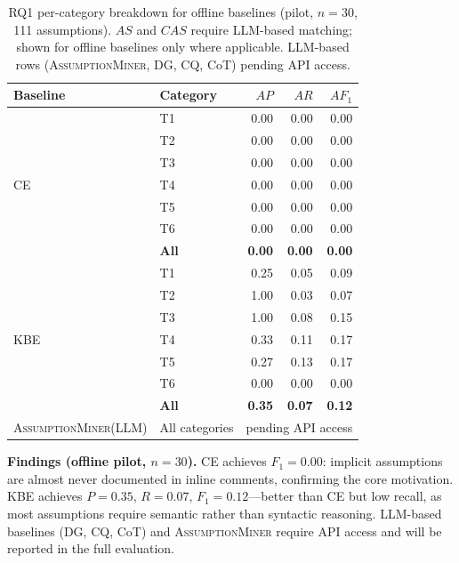 \documentclass[sigconf,review,anonymous]{acmart}
\newcommand{\sysname}{\textsc{AssumptionMiner}\xspace}
\newcommand{\AR}{$\mathit{AR}$\xspace}
\newcommand{\AP}{$\mathit{AP}$\xspace}
\newcommand{\AFone}{$\mathit{AF_1}$\xspace}
\newcommand{\AS}{$\mathit{AS}$\xspace}
\newcommand{\CAS}{$\mathit{CAS}$\xspace}
\begin{document}
\begin{table}[t]
\caption{RQ1 per-category breakdown for offline baselines (pilot, $n=30$, 111 assumptions).
         \AS and \CAS require LLM-based matching; shown for offline baselines only where applicable.
         LLM-based rows (\sysname, DG, CQ, CoT) pending API access.}
\label{tab:rq1breakdown}
\small
\begin{tabular}{@{}llrrr@{}}
\toprule
\textbf{Baseline} & \textbf{Category} & \AP & \AR & \AFone \\
\midrule
\multirow{7}{*}{CE} & T1 & 0.00 & 0.00 & 0.00 \\
                    & T2 & 0.00 & 0.00 & 0.00 \\
                    & T3 & 0.00 & 0.00 & 0.00 \\
                    & T4 & 0.00 & 0.00 & 0.00 \\
                    & T5 & 0.00 & 0.00 & 0.00 \\
                    & T6 & 0.00 & 0.00 & 0.00 \\
\cmidrule{2-5}
                    & \textbf{All} & \textbf{0.00} & \textbf{0.00} & \textbf{0.00} \\
\midrule
\multirow{7}{*}{KBE}& T1 & 0.25 & 0.05 & 0.09 \\
                    & T2 & 1.00 & 0.03 & 0.07 \\
                    & T3 & 1.00 & 0.08 & 0.15 \\
                    & T4 & 0.33 & 0.11 & 0.17 \\
                    & T5 & 0.27 & 0.13 & 0.17 \\
                    & T6 & 0.00 & 0.00 & 0.00 \\
\cmidrule{2-5}
                    & \textbf{All} & \textbf{0.35} & \textbf{0.07} & \textbf{0.12} \\
\midrule
\sysname (LLM) & All categories & \multicolumn{3}{c}{pending API access} \\
\bottomrule
\end{tabular}
\end{table}

\textbf{Findings (offline pilot, $n=30$).}
CE achieves $F_1=0.00$: implicit assumptions are almost never documented in inline comments, confirming the core motivation.
KBE achieves $P=0.35$, $R=0.07$, $F_1=0.12$—better than CE but low recall, as most assumptions require semantic rather than syntactic reasoning.
LLM-based baselines (DG, CQ, CoT) and \sysname require API access and will be reported in the full evaluation.
\end{document}
